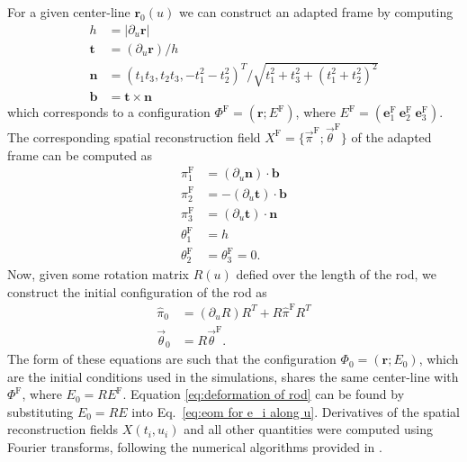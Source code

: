 \documentclass[]{cam-thesis}
\begin{document}
For a given center-line $\mathbf{r}_0(u)$ we can construct an adapted frame by computing
\begin{subequations}
\begin{align}
	 h & = |\partial_u \mathbf{r}| \\
	\mathbf{t} & = (\partial_u \mathbf{r}) / h \\
	\mathbf{n} & = (t_1 t_3, t_2 t_3, -t_1^2 - t_2^2)^T / \sqrt{ t_1^2 + t_3^2 +(t_1^2 + t_2^2)^2 } \\
	\mathbf{b} & = \mathbf{t} \times \mathbf{n}
\end{align}
\end{subequations}
which corresponds to a configuration $\Phi^\text{F} = (\mathbf{r} ; E^\text{F})$, where $E^\text{F} = (\mathbf{e}_1^\text{F}\ \mathbf{e}_2^\text{F}\ \mathbf{e}_3^\text{F})$. The corresponding spatial reconstruction field $X^\text{F} = \{ \vec{\pi}^\text{F}; \vec{\theta}^\text{F} \}$ of the adapted frame can be computed as
\begin{subequations}
	\begin{align}
		\pi_1^\text{F} & = (\partial_u \mathbf{n}) \cdot \mathbf{b} \\
		\pi_2^\text{F} & = - (\partial_u \mathbf{t}) \cdot \mathbf{b} \\
		\pi_3^\text{F} & = (\partial_u \mathbf{t}) \cdot \mathbf{n} \\
		\theta_1^\text{F} & = h\\
		\theta_2^\text{F} & = \theta_3^\text{F} = 0.
	\end{align}
\end{subequations}
Now, given some rotation matrix $R(u)$ defied over the length of the rod, we construct the initial configuration of the rod as 
\begin{subequations} \label{eq:deformation of rod}
	\begin{align}
		\hat{\pi}_0 & = (\partial_u R) R^T + R \hat{\pi}^\text{F} R^T \\
		\vec{\theta}_0 & = R \vec{\theta}^\text{F}.
	\end{align}
\end{subequations}
The form of these equations are such that the configuration $\Phi_0 = (\mathbf{r} ; E_0)$, which are the initial conditions used in the simulations, shares the same center-line with $\Phi^\text{F}$, where $E_0 = R E^\text{F}$. Equation \ref{eq:deformation of rod} can be found by substituting $E_0 = R E$ into Eq.~\ref{eq:eom for e_i along u}. Derivatives of the spatial reconstruction fields $X(t_i, u_i)$ and all other quantities were computed using Fourier transforms, following the numerical algorithms provided in \citep{trefethen2000spectral}.
\end{document}

